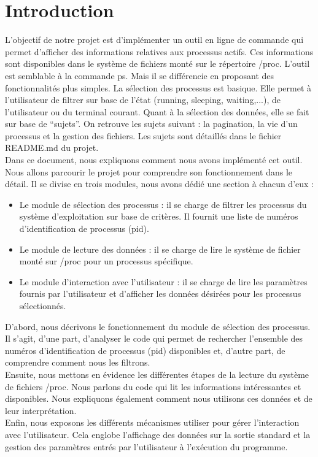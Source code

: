 \section{Introduction}
L’objectif de notre projet est d’implémenter un outil en ligne de commande qui permet d’afficher des informations relatives aux processus actifs. Ces informations sont disponibles dans le système de fichiers monté sur le répertoire /proc. 
L’outil est semblable à la commande ps. Mais il se différencie en proposant des fonctionnalités plus simples.  La sélection des processus est basique. Elle permet à l’utilisateur de filtrer sur base de l’état (running, sleeping, waiting,...), de l’utilisateur ou du terminal courant. Quant à la sélection des données, elle se fait sur base de “sujets”. On retrouve les sujets suivant : la pagination, la vie d’un processus et la gestion des fichiers. Les sujets sont détaillés dans le fichier README.md du projet.\\

Dans ce document, nous expliquons comment nous avons implémenté cet outil. Nous allons parcourir le projet pour comprendre son fonctionnement dans le détail. Il se divise en trois modules, nous avons dédié une section à chacun d’eux :

\begin{itemize}
\item Le module de sélection des processus : il se charge de filtrer les processus du système d’exploitation sur base de critères. Il fournit une liste de numéros d’identification de processus (pid).
\item Le module de lecture des données : il se charge de lire le système de fichier monté sur /proc pour un processus spécifique.
\item Le module d’interaction avec l’utilisateur : il se charge de lire les paramètres fournis par l’utilisateur et d’afficher les données désirées pour les processus sélectionnés.
\end{itemize}

D’abord, nous décrivons le fonctionnement du module de sélection des processus. Il s’agit, d’une part, d’analyser le code qui permet de rechercher l’ensemble des numéros  d’identification de processus (pid) disponibles et, d’autre part, de comprendre comment nous les filtrons.\\
Ensuite, nous mettons en évidence les différentes étapes de la lecture du système de fichiers /proc. Nous parlons du code qui lit les informations intéressantes et disponibles. Nous expliquons également comment nous utilisons ces données et de leur interprétation.\\
Enfin, nous exposons les différents mécanismes utiliser pour gérer l’interaction avec l’utilisateur. Cela englobe l’affichage des données sur la sortie standard et la gestion des paramètres entrés par l’utilisateur à l’exécution du programme.
